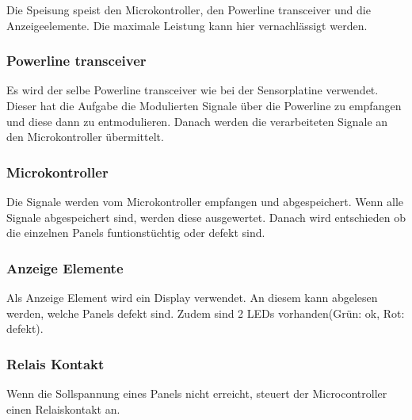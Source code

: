 Die Speisung speist den Microkontroller, den Powerline transceiver und die Anzeigeelemente. Die maximale Leistung kann hier vernachlässigt werden.

\subsubsection{Powerline transceiver}
Es wird der selbe Powerline transceiver wie bei der Sensorplatine verwendet. Dieser hat die Aufgabe die Modulierten Signale über die Powerline zu empfangen und diese dann zu entmodulieren. Danach werden die verarbeiteten Signale an den Microkontroller übermittelt.

\subsubsection{Microkontroller}
Die Signale werden vom Microkontroller empfangen und abgespeichert. Wenn alle Signale abgespeichert sind, werden diese ausgewertet. Danach wird entschieden ob die einzelnen Panels funtionstüchtig oder defekt sind.

\subsubsection{Anzeige Elemente}
Als Anzeige Element wird ein Display verwendet. An diesem kann abgelesen werden, welche Panels defekt sind. Zudem sind 2 LEDs vorhanden(Grün: ok, Rot: defekt).

\subsubsection{Relais Kontakt}
Wenn die Sollspannung eines Panels nicht erreicht, steuert der Microcontroller einen Relaiskontakt an. 

%
